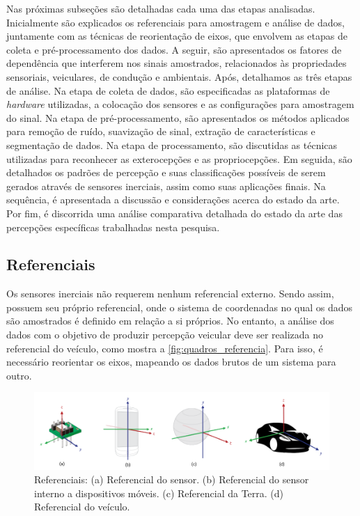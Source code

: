 Nas próximas subseções são detalhadas cada uma das etapas analisadas. Inicialmente são explicados os referenciais para amostragem e análise de dados, juntamente com as técnicas de reorientação de eixos, que envolvem as etapas de coleta e pré-processamento dos dados. A seguir, são apresentados os fatores de dependência que interferem nos sinais amostrados, relacionados às propriedades sensoriais, veiculares, de condução e ambientais. Após, detalhamos as três etapas de análise. Na etapa de coleta de dados, são especificadas as plataformas de \textit{hardware} utilizadas, a colocação dos sensores e as configurações para amostragem do sinal. Na etapa de pré-processamento, são apresentados os métodos aplicados para remoção de ruído, suavização de sinal, extração de características e segmentação de dados. Na etapa de processamento, são discutidas as técnicas utilizadas para reconhecer as exterocepções e as propriocepções. Em seguida, são detalhados os padrões de percepção e suas classificações possíveis de serem gerados através de sensores inerciais, assim como suas aplicações finais. Na sequência, é apresentada a discussão e considerações acerca do estado da arte. Por fim, é discorrida uma análise comparativa detalhada do estado da arte das percepções específicas trabalhadas nesta pesquisa.

\subsection{Referenciais}

Os sensores inerciais não requerem nenhum referencial externo. Sendo assim, possuem seu próprio referencial, onde o sistema de coordenadas no qual os dados são amostrados é definido em relação a si próprios. No entanto, a análise dos dados com o objetivo de produzir percepção veicular deve ser realizada no referencial do veículo, como mostra a \autoref{fig:quadros_referencia}. Para isso, é necessário reorientar os eixos, mapeando os dados brutos de um sistema para outro.

\begin{figure}[h]
  \centering
  \caption{Referenciais: (a) Referencial do sensor. (b) Referencial do sensor interno a dispositivos móveis. (c) Referencial da Terra. (d) Referencial do veículo.}
   \label{fig:quadros_referencia}
   \includegraphics[width=1\textwidth]{figuras/fig_3.png}
\end{figure}

